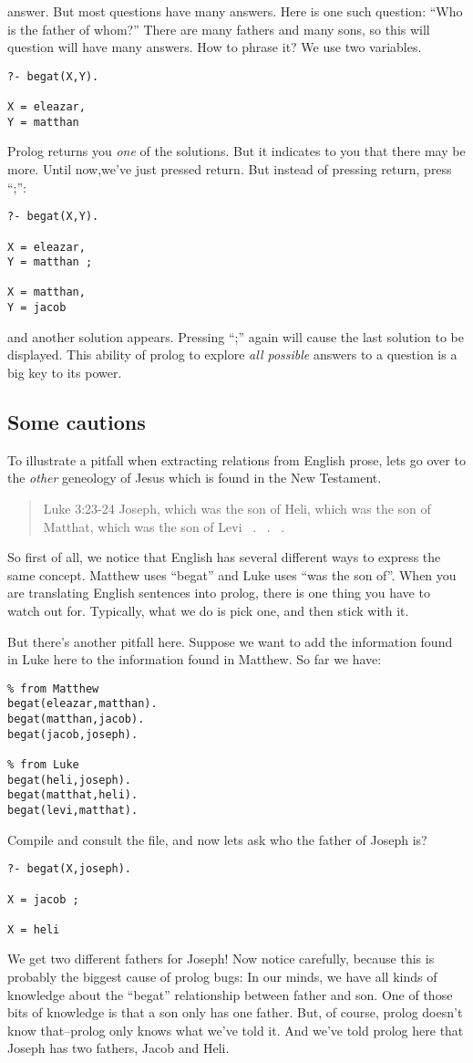 \documentclass{book}[9pt]
\begin{document}
answer.  But most questions have many answers.  Here is one such
question: ``Who is the father of whom?''  There are many fathers and
many sons, so this will question will have many answers.  How to
phrase it?  We use two variables.
\begin{verbatim}
?- begat(X,Y).

X = eleazar,
Y = matthan
\end{verbatim}
\noindent Prolog returns you {\em one} of the solutions.  But it
indicates to you that there may be more.  Until now,we've just pressed return.
But instead of pressing return, press ``;'':
\begin{verbatim}
?- begat(X,Y).

X = eleazar,
Y = matthan ;

X = matthan,
Y = jacob 
\end{verbatim}
\noindent and another solution appears.  Pressing ``;'' again will
cause the last solution to be displayed.  This ability of prolog to
explore {\em all possible} answers to a question is a big key to its
power.

\subsection{Some cautions}

To illustrate a pitfall when extracting relations from English prose, 
lets go over to the {\em other} geneology of Jesus which is found in
the New Testament. 
\begin{quote}
Luke 3:23-24 
Joseph, which was the son of Heli, which was the son of
Matthat, which was the son of Levi \ . \ . \ .
\end{quote}
\noindent So first of all, we notice that English has several
different ways to express the same concept.  Matthew uses ``begat''
and Luke uses ``was the son of''.  When you are translating English
sentences into prolog, there is one thing you have to watch out for.
Typically, what we do is pick one, and then stick with it.

But there's another pitfall here.  Suppose we want to add the
information found in Luke here to the information found in Matthew.
So far we have:
\begin{verbatim}
% from Matthew
begat(eleazar,matthan).
begat(matthan,jacob).
begat(jacob,joseph).

% from Luke
begat(heli,joseph).
begat(matthat,heli).
begat(levi,matthat).
\end{verbatim}
\noindent Compile and consult the file, and now lets ask who the
father of Joseph is?
\begin{verbatim}
?- begat(X,joseph).

X = jacob ;

X = heli
\end{verbatim}
\noindent We get two different fathers for Joseph!  Now notice
carefully, because this is probably the biggest cause of prolog bugs:
In our minds, we have all kinds of knowledge about the ``begat'' relationship
between father and son.  One of those bits of knowledge is that a son
only has one father.  But, of course, prolog doesn't know that--prolog
only knows what we've told it.  And we've told prolog here that Joseph
has two fathers, Jacob and Heli.
\end{document}
